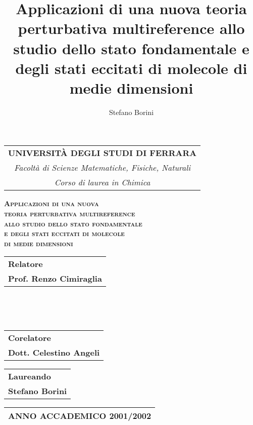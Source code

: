 \documentclass[a4paper,11pt,oneside]{book}
\title{\textbf{Applicazioni di una nuova teoria perturbativa multireference allo
studio dello stato fondamentale e degli stati eccitati di molecole di medie
dimensioni}}
\author{Stefano Borini}
\begin{document}
\begin{titlepage}
\begin{center}
\begin{tabular}{c}
{\Large \textbf{UNIVERSIT\`A DEGLI STUDI DI FERRARA}} \\
{\Large \textit{Facolt\`a di Scienze Matematiche, Fisiche, Naturali}} \\
{\Large \textit{Corso di laurea in Chimica}} \\
\hline
\end{tabular}

\vspace{5cm}
{\textsc{\fontsize{17}{5mm}\selectfont \textbf{Applicazioni di una nuova\\teoria perturbativa multireference\\allo studio dello stato fondamentale\\e degli stati eccitati di molecole\\di medie dimensioni}}}

\vspace{45mm}

{ 
\begin{tabular}{l} \large \textbf{Relatore} \\ \large \textbf{Prof. Renzo Cimiraglia}
\end{tabular} \hfill {\ } } \\
\vspace{13mm}
{ \begin{tabular}{l} \large \textbf{Corelatore} \\ \large \textbf{Dott. Celestino Angeli}\end{tabular} } \hfill { \begin{tabular}{l} \large \textbf{Laureando} \\ \large \textbf{Stefano Borini} \end{tabular} }

\vspace{26mm}
\begin{tabular}{c}
\hline
{\large \textbf{ANNO ACCADEMICO 2001/2002}} \\
\hline
\end{tabular}

\end{center}
\end{titlepage}
{}
\tableofcontents






\nocite{*}


\end{document}
